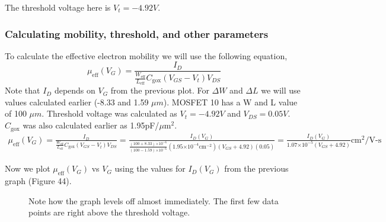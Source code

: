 \documentclass{article}
\providecommand{\e}[1]{\ensuremath{\times 10^{#1}}}
\begin{document}
The threshold voltage here is $V_t = -4.92 V$.

\subsubsection{Calculating mobility, threshold, and other parameters}
To calculate the effective electron mobility we will use the following equation,
\begin{equation}
\mu_{\text{eff}}(V_G) = \frac{I_D}{\frac{W_{\text{eff}}}{L_{\text{eff}}}C_{\text{gox}}(V_{GS} - V_t)V_{DS}}
\end{equation}
Note that $I_D$ depends on $V_{G}$ from the previous plot. For $\Delta W$ and $\Delta L$ we will use values calculated earlier (-8.33 and 1.59 $\mu m$). MOSFET 10 has a W and L value of 100 $\mu m$. Threshold voltage was calculated as $V_t = -4.92 V$ and $V_{DS} = 0.05 V$. $C_{\text{gox}}$ was also calculated earlier as 1.95pF/${\mu\text{m}}^{2}$.
\begin{align*}
\mu_{\text{eff}}(V_G) = \frac{I_D}{\frac{W_{\text{eff}}}{L_{\text{eff}}}C_{\text{gox}}(V_{GS} - V_t)V_{DS}} = \frac{I_D(V_G)}{\frac{(100 + 8.33)\e{-6}}{(100 - 1.59)\e{-6}}(1.95\e{-4}\text{cm}^{-2})(V_{GS} + 4.92)(0.05)} = \frac{I_D(V_G)}{1.07\e{-5}(V_{GS} + 4.92)}{\text{cm}}^2/\text{V-s}
\end{align*}

Now we plot $\mu_{\text{eff}}(V_G)$ vs $V_G$ using the values for $I_D(V_G)$ from the previous graph (Figure 44).
\begin{figure}[H]
\centering
{}
\caption{Note how the graph levels off almost immediately. The first few data points are right above the threshold voltage.}
\end{figure}
\end{document}
